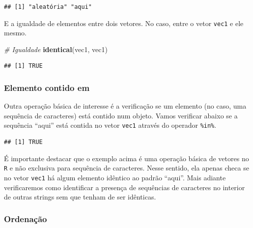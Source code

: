 \documentclass[]{book}
\newenvironment{Shaded}{\begin{snugshade}}{\end{snugshade}}
\newcommand{\CommentTok}[1]{\textcolor[rgb]{0.56,0.35,0.01}{\textit{#1}}}
\newcommand{\KeywordTok}[1]{\textcolor[rgb]{0.13,0.29,0.53}{\textbf{#1}}}
\newcommand{\NormalTok}[1]{#1}
\newcommand{\OperatorTok}[1]{\textcolor[rgb]{0.81,0.36,0.00}{\textbf{#1}}}
\newcommand{\StringTok}[1]{\textcolor[rgb]{0.31,0.60,0.02}{#1}}
\begin{document}
\begin{verbatim}
## [1] "aleatória" "aqui"
\end{verbatim}

E a igualdade de elementos entre dois vetores. No caso, entre o vetor \texttt{vec1} e ele mesmo.

\begin{Shaded}
\begin{Highlighting}[]
\CommentTok{# Igualdade }
\KeywordTok{identical}\NormalTok{(vec1, vec1)}
\end{Highlighting}
\end{Shaded}

\begin{verbatim}
## [1] TRUE
\end{verbatim}

\hypertarget{elemento-contido-em}{%
\subsubsection{Elemento contido em}\label{elemento-contido-em}}

Outra operação básica de interesse é a verificação se um elemento (no caso, uma sequência de caracteres) está contido num objeto. Vamos verificar abaixo se a sequência ``aqui'' está contida no vetor \texttt{vec1} através do operador \texttt{\%in\%}.

\begin{Shaded}
\end{Shaded}

\begin{verbatim}
## [1] TRUE
\end{verbatim}

É importante destacar que o exemplo acima é uma operação básica de vetores no \texttt{R} e não exclusiva para sequência de caracteres. Nesse sentido, ela apenas checa se no vetor \texttt{vec1} há algum elemento idêntico ao padrão ``aqui''. Mais adiante verificaremos como identificar a presença de sequências de caracteres no interior de outras strings sem que tenham de ser idênticas.

\hypertarget{ordenauxe7uxe3o}{%
\subsubsection{Ordenação}\label{ordenauxe7uxe3o}}
\end{document}
